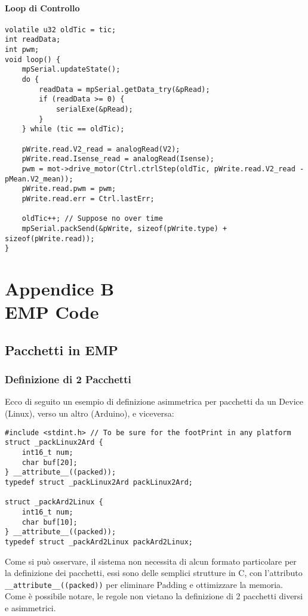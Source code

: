 \subsubsection{Loop di Controllo}
\begin{lstlisting}[style=cppStyle,caption={Loop di Controllo},label=lst:controlLoop] 
volatile u32 oldTic = tic;
int readData;
int pwm;
void loop() {
	mpSerial.updateState();
	do {
		readData = mpSerial.getData_try(&pRead);
		if (readData >= 0) {
			serialExe(&pRead);
		}
	} while (tic == oldTic);
	
	pWrite.read.V2_read = analogRead(V2);
	pWrite.read.Isense_read = analogRead(Isense);
	pwm = mot->drive_motor(Ctrl.ctrlStep(oldTic, pWrite.read.V2_read - pMean.V2_mean));
	pWrite.read.pwm = pwm;
	pWrite.read.err = Ctrl.lastErr;
	
	oldTic++; // Suppose no over time
	mpSerial.packSend(&pWrite, sizeof(pWrite.type) + sizeof(pWrite.read));
}
\end{lstlisting}

\chapter*{Appendice B\\ EMP Code} \label{EMPCode}
\setcounter{chapter}{\thechapter + 1}

\section{Pacchetti in EMP}
\subsection{Definizione di 2 Pacchetti}
Ecco di seguito un esempio di definizione asimmetrica per pacchetti da un Device (Linux), verso un altro (Arduino), e viceversa:\\
\begin{lstlisting}[style=cppStyle,caption={Esempio di definizione Pacchetto in EMP},label=lst:EMPpackDef] 
#include <stdint.h>	// To be sure for the footPrint in any platform
struct _packLinux2Ard {
	int16_t num;
	char buf[20];
} __attribute__((packed));
typedef struct _packLinux2Ard packLinux2Ard;

struct _packArd2Linux {
	int16_t num;
	char buf[10];
} __attribute__((packed));
typedef struct _packArd2Linux packArd2Linux;
\end{lstlisting}
\noindent
Come si può osservare, il sistema non necessita di alcun formato particolare per la definizione dei pacchetti, essi sono delle semplici strutture in C, con l'attributo \verb|__attribute__((packed))| per eliminare Padding e ottimizzare la memoria.
Come è possibile notare, le regole non vietano la definizione di 2 pacchetti diversi e asimmetrici.
\newpage

